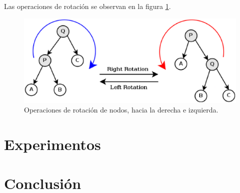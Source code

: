 \documentclass[12pt,letterpaper]{article}
\begin{document}
Las operaciones de rotación se observan en la figura \ref{fig:rotaciones}.

\begin{figure}[ht]
\centering
\includegraphics[scale=0.7]{rotations.eps}
\caption{Operaciones de rotación de nodos, hacia la derecha e izquierda.}
\label{fig:rotaciones}
\end{figure}

\section{Experimentos}


\section{Conclusión}


\end{document}
